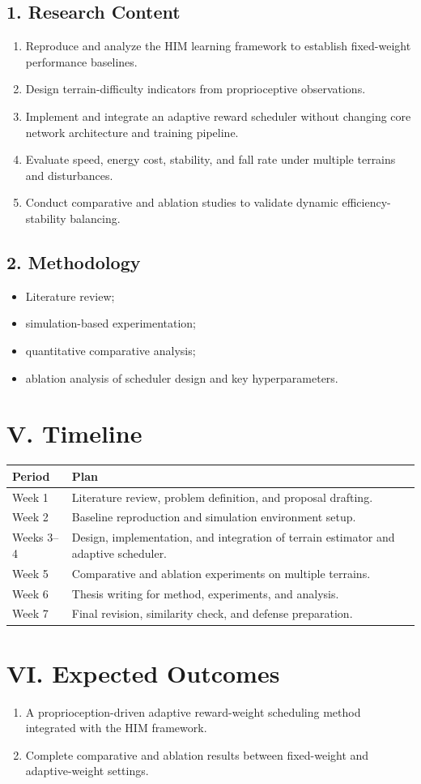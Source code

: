 \documentclass{article}
\begin{document}
\subsection*{1. Research Content}
\begin{enumerate}
  \item Reproduce and analyze the HIM learning framework to establish fixed-weight performance baselines.
  \item Design terrain-difficulty indicators from proprioceptive observations.
  \item Implement and integrate an adaptive reward scheduler without changing core network architecture and training pipeline.
  \item Evaluate speed, energy cost, stability, and fall rate under multiple terrains and disturbances.
  \item Conduct comparative and ablation studies to validate dynamic efficiency-stability balancing.
\end{enumerate}

\subsection*{2. Methodology}
\begin{itemize}
  \item Literature review;
  \item simulation-based experimentation;
  \item quantitative comparative analysis;
  \item ablation analysis of scheduler design and key hyperparameters.
\end{itemize}

\section*{V. Timeline}
\begin{longtable}{|p{3.6cm}|p{10.7cm}|}
\hline
Period & Plan \\
\hline
Week 1 & Literature review, problem definition, and proposal drafting. \\
\hline
Week 2 & Baseline reproduction and simulation environment setup. \\
\hline
Weeks 3--4 & Design, implementation, and integration of terrain estimator and adaptive scheduler. \\
\hline
Week 5 & Comparative and ablation experiments on multiple terrains. \\
\hline
Week 6 & Thesis writing for method, experiments, and analysis. \\
\hline
Week 7 & Final revision, similarity check, and defense preparation. \\
\hline
\end{longtable}

\section*{VI. Expected Outcomes}
\begin{enumerate}
  \item A proprioception-driven adaptive reward-weight scheduling method integrated with the HIM framework.
  \item Complete comparative and ablation results between fixed-weight and adaptive-weight settings.
\end{enumerate}
\end{document}

